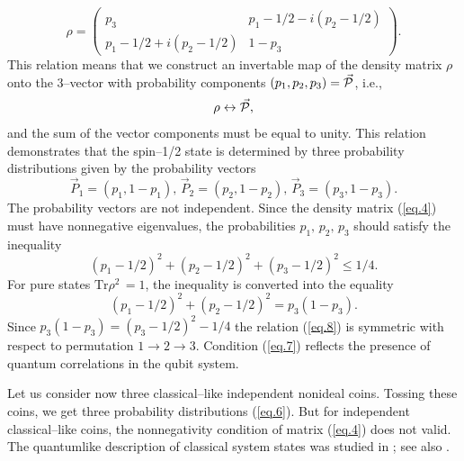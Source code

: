 \documentclass[12pt]{article}
\begin{document}
\begin{equation}\label{eq.4}
\rho=\left(\begin{array}{cc}
p_3&p_1-1/2-i(p_2-1/2)\\p_1-1/2+i(p_2-1/2)&1-p_3\end{array}\right).
\end{equation}
This relation means that we construct an invertable map of the density matrix $\rho$ onto the 3--vector with probability components $(p_1,p_2,p_3)=\vec{\cal P}$, i.e.,  
\begin{equation}\label{eq.5}
\rho\leftrightarrow\vec{\cal P}, 
\end{equation}
and the sum of the vector components must be equal to unity. This relation demonstrates that the spin--1/2 state is determined by three probability distributions given by the probability vectors
\begin{equation}\label{eq.6}
\vec P_1=(p_1,1-p_1),\,\vec P_2=(p_2,1-p_2),\,\vec P_3=(p_3,1-p_3).
\end{equation}
The probability vectors are not independent. Since the density matrix (\ref{eq.4}) must have nonnegative eigenvalues, the probabilities $p_1,\,p_2,\,p_3$ should satisfy the inequality 
\begin{equation}\label{eq.7}
(p_1-1/2)^2+(p_2-1/2)^2+(p_3-1/2)^2\leq 1/4.
\end{equation}
For pure states $\mbox{Tr}\rho^2\,=1$, the inequality is converted into the equality 
\begin{equation}\label{eq.8}
(p_1-1/2)^2+(p_2-1/2)^2=p_3(1-p_3).
\end{equation}
Since $p_3(1-p_3)=(p_3-1/2)^2-1/4$ the relation (\ref{eq.8}) is symmetric with respect to permutation $1\rightarrow2\rightarrow3$. Condition (\ref{eq.7}) reflects the presence of quantum correlations in the qubit system. 

Let us consider now three classical--like independent nonideal coins. Tossing these coins, we get three probability distributions (\ref{eq.6}). But for independent classical--like coins, the nonnegativity condition of matrix (\ref{eq.4}) does not valid. The quantumlike description of classical system states was studied in \cite{Koopman,Neumann1}; see also \cite{OVVILasRes}.
\end{document}
